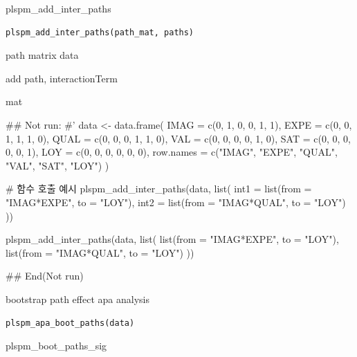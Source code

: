 \documentclass[a4paper]{book}
\begin{document}
%
\begin{Description}
plspm\_add\_inter\_paths
\end{Description}
%
\begin{Usage}
\begin{verbatim}
plspm_add_inter_paths(path_mat, paths)
\end{verbatim}
\end{Usage}
%
\begin{Arguments}
\begin{ldescription}
\item[\code{path\_mat}] path matrix data

\item[\code{paths}] add path, interactionTerm
\end{ldescription}
\end{Arguments}
%
\begin{Value}
mat
\end{Value}
%
\begin{Examples}
\begin{ExampleCode}


\#\# Not run: 
#'
data <- data.frame(
  IMAG = c(0, 1, 0, 0, 1, 1),
  EXPE = c(0, 0, 1, 1, 1, 0),
  QUAL = c(0, 0, 0, 1, 1, 0),
  VAL  = c(0, 0, 0, 0, 1, 0),
  SAT  = c(0, 0, 0, 0, 0, 1),
  LOY  = c(0, 0, 0, 0, 0, 0),
  row.names = c("IMAG", "EXPE", "QUAL", "VAL", "SAT", "LOY")
)

# 함수 호출 예시
plspm_add_inter_paths(data, list(
  int1 = list(from = "IMAG*EXPE", to = "LOY"),
  int2 = list(from = "IMAG*QUAL", to = "LOY")
))

plspm_add_inter_paths(data, list(
  list(from = "IMAG*EXPE", to = "LOY"),
  list(from = "IMAG*QUAL", to = "LOY")
))



## End(Not run)


\end{ExampleCode}
\end{Examples}
%
\begin{Description}
bootstrap path effect apa analysis
\end{Description}
%
\begin{Usage}
\begin{verbatim}
plspm_apa_boot_paths(data)
\end{verbatim}
\end{Usage}
%
\begin{Arguments}
\begin{ldescription}
\item[\code{data}] plspm\_boot\_paths\_sig
\end{ldescription}
\end{Arguments}
\end{document}

